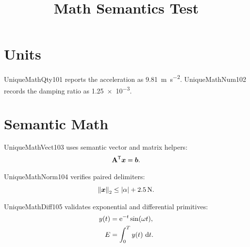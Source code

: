 \documentclass{SUSTechHomework}
\title{Math Semantics Test}
\begin{document}
\maketitle

\section{Units}

UniqueMathQty101 reports the acceleration as \qty{9.81}{\meter\per\second\squared}.
UniqueMathNum102 records the damping ratio as \num{1.25e-3}.

\section{Semantic Math}

UniqueMathVect103 uses semantic vector and matrix helpers:
\[
  \mat{A}^{\trans}\vect{x} = \vect{b}.
\]

UniqueMathNorm104 verifies paired delimiters:
\[
  \norm*{\vect{x}}_2 \le \abs*{\alpha} + \qty{2.5}{\newton}.
\]

UniqueMathDiff105 validates exponential and differential primitives:
\begin{align}
  y(t) &= \e^{-t}\sin(\omega t), \\
  E &= \int_0^T y(t)\,\diff t.
\end{align}
\end{document}
